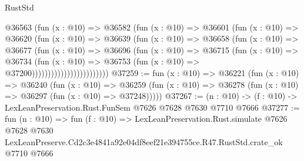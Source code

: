 \begin{lexlean}{RustStd}
\begin{coremodule}
                            @36563
                              (fun (x : @10) =>
                              @36582
                                (fun (x : @10) =>
                                @36601
                                  (fun (x : @10) =>
                                  @36620
                                    (fun (x : @10) =>
                                    @36639
                                      (fun (x : @10) =>
                                      @36658
                                        (fun (x : @10) =>
                                        @36677
                                          (fun (x : @10) =>
                                          @36696
                                            (fun (x : @10) =>
                                            @36715
                                              (fun (x : @10) =>
                                              @36734
                                                (fun (x : @10) =>
                                                @36753
                                                  (fun (x : @10) => @37200))))))))))))))))))))))))
@37259 := fun (x : @10) =>
  @36221
    (fun (x : @10) =>
    @36240
      (fun (x : @10) =>
      @36259 (fun (x : @10) => @36278 (fun (x : @10) => @36297 (fun (x : @10) => @37248)))))
@37267 := (n : @10) -> (f : @10) -> LexLeanPreservation.Rust.FunSem @7626 @7628 @7630 @7710 @7666
@37277 := fun (n : @10) =>
  fun (f : @10) =>
  LexLeanPreservation.Rust.simulate
    @7626
    @7628
    @7630
    LexLeanPreserve.Cd2c3e4841a92e04df8eef21e394755ce.R47.RustStd.crate_ok
    @7710
    @7666
\end{coremodule}
\end{lexlean}
